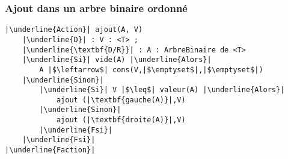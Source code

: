 \documentclass[table,handout,tikz,12pt,svgnames]{beamer}
\begin{document}
\begin{frame}[fragile=singleslide]
	\frametitle{Ajout dans un arbre binaire ordonné}
	\vspace{-0.1cm}
	\begin{verbatim}
|\underline{Action}| ajout(A, V)
	|\underline{D}| : V : <T> ;
	|\underline{\textbf{D/R}}| : A : ArbreBinaire de <T>
	|\underline{Si}| vide(A) |\underline{Alors}|
		A |$\leftarrow$| cons(V,|$\emptyset$|,|$\emptyset$|)
	|\underline{Sinon}|
		|\underline{Si}| V |$\leq$| valeur(A) |\underline{Alors}|
			ajout (|\textbf{gauche(A)}|,V)
		|\underline{Sinon}|
			ajout (|\textbf{droite(A)}|,V)
		|\underline{Fsi}|
	|\underline{Fsi}|
|\underline{Faction}|
	\end{verbatim}
\end{frame}
\end{document}
